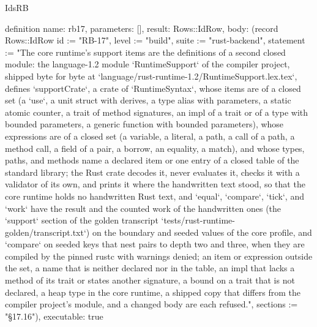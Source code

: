 \begin{lexlean}{IdsRB}
\begin{semanticmodule}
definition{
  name: rb17,
  parameters: [],
  result: Rows::IdRow,
  body: (record Rows::IdRow {id := "RB-17", level := "build", suite := "rust-backend", statement := "The core runtime's support items are the definitions of a second closed module: the language-1.2 module `RuntimeSupport` of the compiler project, shipped byte for byte at `language/rust-runtime-1.2/RuntimeSupport.lex.tex`, defines `supportCrate`, a crate of `RuntimeSyntax`, whose items are of a closed set (a `use`, a unit struct with derives, a type alias with parameters, a static atomic counter, a trait of method signatures, an impl of a trait or of a type with bounded parameters, a generic function with bounded parameters), whose expressions are of a closed set (a variable, a literal, a path, a call of a path, a method call, a field of a pair, a borrow, an equality, a match), and whose types, paths, and methods name a declared item or one entry of a closed table of the standard library; the Rust crate decodes it, never evaluates it, checks it with a validator of its own, and prints it where the handwritten text stood, so that the core runtime holds no handwritten Rust text, and `equal`, `compare`, `tick`, and `work` have the result and the counted work of the handwritten ones (the `support` section of the golden transcript `tests/rust-runtime-golden/transcript.txt`) on the boundary and seeded values of the core profile, and `compare` on seeded keys that nest pairs to depth two and three, when they are compiled by the pinned rustc with warnings denied; an item or expression outside the set, a name that is neither declared nor in the table, an impl that lacks a method of its trait or states another signature, a bound on a trait that is not declared, a heap type in the core runtime, a shipped copy that differs from the compiler project's module, and a changed body are each refused.", sections := "§17.16"}),
  executable: true
}


\end{semanticmodule}
\end{lexlean}
